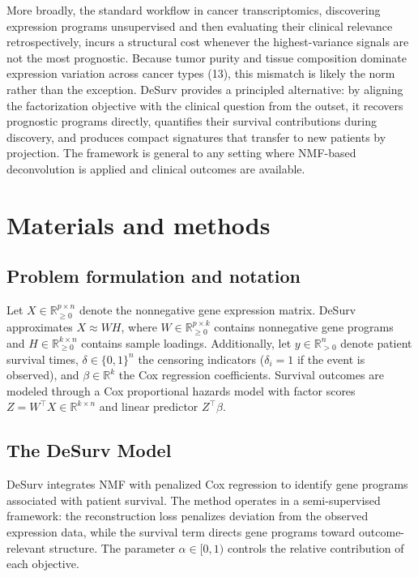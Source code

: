 \documentclass[9pt,twocolumn,twoside,]{pnas-new}
\begin{document}
More broadly, the standard workflow in cancer transcriptomics,
discovering expression programs unsupervised and then evaluating their
clinical relevance retrospectively, incurs a structural cost whenever
the highest-variance signals are not the most prognostic. Because tumor
purity and tissue composition dominate expression variation across
cancer types (13), this mismatch is likely the norm rather than the
exception. DeSurv provides a principled alternative: by aligning the
factorization objective with the clinical question from the outset, it
recovers prognostic programs directly, quantifies their survival
contributions during discovery, and produces compact signatures that
transfer to new patients by projection. The framework is general to any
setting where NMF-based deconvolution is applied and clinical outcomes
are available.

\section*{Materials and methods}\label{materials-and-methods}

\subsection{Problem formulation and
notation}\label{problem-formulation-and-notation}

Let \(X \in \mathbb{R}_{\ge 0}^{p \times n}\) denote the nonnegative
gene expression matrix. DeSurv approximates \(X \approx WH\), where
\(W \in \mathbb{R}_{\ge 0}^{p\times k}\) contains nonnegative gene
programs and \(H \in \mathbb{R}_{\ge 0}^{k\times n}\) contains sample
loadings. Additionally, let \(y \in \mathbb{R}^{n}_{>0}\) denote patient
survival times, \(\delta \in \{0,1\}^{n}\) the censoring indicators
(\(\delta_i = 1\) if the event is observed), and
\(\beta \in \mathbb{R}^{k}\) the Cox regression coefficients. Survival
outcomes are modeled through a Cox proportional hazards model with
factor scores \(Z = W^\top X \in \mathbb{R}^{k \times n}\) and linear
predictor \(Z^\top \beta\).

\subsection{The DeSurv Model}\label{the-desurv-model}

DeSurv integrates NMF with penalized Cox regression to identify gene
programs associated with patient survival. The method operates in a
semi-supervised framework: the reconstruction loss penalizes deviation
from the observed expression data, while the survival term directs gene
programs toward outcome-relevant structure. The parameter
\(\alpha \in [0,1)\) controls the relative contribution of each
objective.
\end{document}
